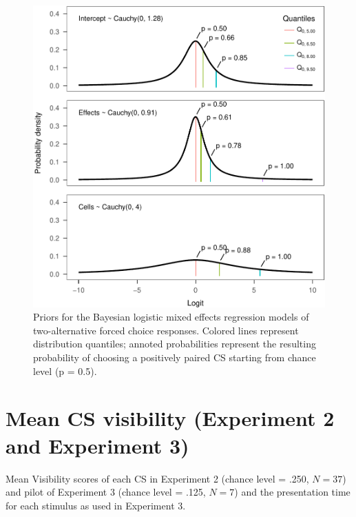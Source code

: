 \documentclass[
  ,doc,11pt, twoside,floatsintext]{apa6}
\begin{document}
\begin{appendix}
\begin{figure}[!h]
\centering
\includegraphics{Chapter02_files/figure-latex/appendix-figure-1.pdf}
\caption{\label{fig:appendix-figure}Priors for the Bayesian logistic mixed
effects regression models of two-alternative forced choice responses.
Colored lines represent distribution quantiles; annoted probabilities
represent the resulting probability of choosing a positively paired CS
starting from chance level (p = 0.5).}
\end{figure}

\clearpage

\section{Mean CS visibility (Experiment 2 and Experiment
3)}\label{mean-cs-visibility-experiment-2-and-experiment-3}

Mean Visibility scores of each CS in Experiment 2 (chance level = .250,
\(N = 37\)) and pilot of Experiment 3 (chance level = .125, \(N = 7\))
and the presentation time for each stimulus as used in Experiment 3.


\end{appendix}
\end{document}
